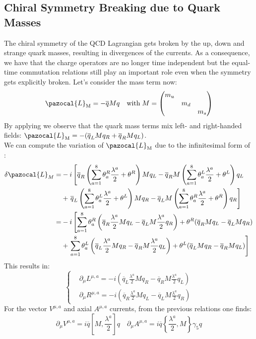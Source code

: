 \documentclass[../main.tex]{subfiles}
\begin{document}
\subsection{Chiral Symmetry Breaking due to Quark Masses}
The chiral symmetry of the QCD Lagrangian gets broken by the up, down and strange quark masses, resulting in divergences of the currents. As a consequence, we have that the charge operators are no longer time independent but the equal-time commutation relations still play an important role even when the symmetry gets explicitly broken. Let's consider the mass term now:
\[
\pazocal{L}_{\text{M}}=-\overline{q}Mq \quad \text{with}\;M=\mqty(\dmat{m_u,m_d,m_s})
\]
By applying  we observe that the quark mass terms mix left- and right-handed fields:
$\pazocal{L}_{\text{M}}=-(\overline{q}_LMq_R+\overline{q}_RMq_L)$.\\
We can compute the variation of $\pazocal{L}_{\text{M}}$ due to the infinitesimal form of :
\begin{align*}
\delta\pazocal{L}_M=&-i\left[\overline{q}_R\left(\sum_{a=1}^8\theta_a^R\frac{\lambda^a}{2}+\theta^R\right)Mq_L-\overline{q}_RM\left(\sum_{a=1}^8\theta_a^L\frac{\lambda^a}{2}+\theta^L\right)q_L\right.\\
&+\left.\overline{q}_L\left(\sum_{a=1}^8\theta_a^L\frac{\lambda^a}{2}+\theta^L\right)Mq_R-\overline{q}_LM\left(\sum_{a=1}^8\theta_a^R\frac{\lambda^a}{2}+\theta^R\right)q_R\right]\\
=&-i\left[\sum_{a=1}^8\theta_a^R\left(\overline{q}_R\frac{\lambda^a}{2}Mq_L-\overline{q}_LM\frac{\lambda^a}{2}q_R\right)+\theta^R(\overline{q}_RMq_L-\overline{q}_LMq_R)\right.\\
&+\left.\sum_{a=1}^8\theta_a^L\left(\overline{q}_L\frac{\lambda^a}{2}Mq_R-\overline{q}_RM\frac{\lambda^a}{2}q_L\right)+\theta^L(\overline{q}_LMq_R-\overline{q}_RMq_L)\right]
\end{align*}
This results in:
\[
\left\{
\begin{aligned}
&\partial_\mu L^{\mu,a}=-i\left(\overline{q}_L\frac{\lambda^a}{2}Mq_R-\overline{q}_RM\frac{\lambda^a}{2}q_L\right)\\
&\partial_\mu R^{\mu,a}=-i\left(\overline{q}_R\frac{\lambda^a}{2}Mq_L-\overline{q}_LM\frac{\lambda^a}{2}q_R\right)
\end{aligned}
\right.
\]
For the vector $V^{\mu,a}$ and axial $A^{\mu,a}$ currents, from the previous relations one finds:
\[
\partial_\mu V^{\mu,a}=i\overline{q}\left[M,\frac{\lambda^a}{2}\right]q \quad \partial_\mu A^{\mu,a}=i\overline{q}\left\{\frac{\lambda^a}{2},M\right\}\gamma_5q
\]
\end{document}
